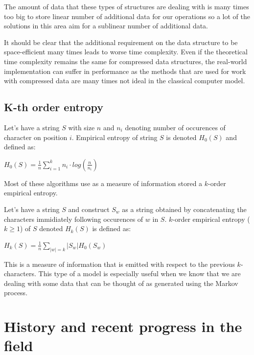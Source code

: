 The amount of data that these types of structures are dealing with is many times too big to store linear number of additional data for our operations so a lot of the solutions in this area aim for a sublinear number of additional data.

It should be clear that the additional requirement on the data structure to be space-efficient many times leads to worse time complexity. Even if the theoretical time complexity remains the same for compressed data structures, the real-world implementation can suffer in performance as the methods that are used for work with compressed data are many times not ideal in the classical computer model.

\subsection{K-th order entropy}

\begin{theorem}
Let's have a string $S$ with size $n$ and $n_i$ denoting number of occurences of character
on position $i$. Empirical entropy of string $S$ is denoted $H_0(S)$ and defined as:
\begin{center}
$H_0(S) = \frac{1}{n} \sum_{i=1}^{k} n_i\cdot log(\frac{n}{n_i})$
\end{center}
\end{theorem}

Most of these algorithms use as a measure of information stored a $k$-order empirical entropy.

\begin{theorem}
Let's have a string $S$ and construct $S_w$ as a string obtained by concatenating the characters immidiately following occurences of $w$ in $S$.
$k$-order empirical entropy ($k \geq 1$) of $S$ denoted $H_k(S)$ is defined as:
\begin{center}
$H_k(S) = \frac{1}{n} \sum_{|w|=k} |S_w| H_0(S_w)$
\end{center}
\end{theorem}

This is a measure of information that is emitted with respect to the previous $k$-characters. This type of a model is especially useful when we know
that we are dealing with some data that can be thought of as generated using the Markov process.

\section{History and recent progress in the field}

